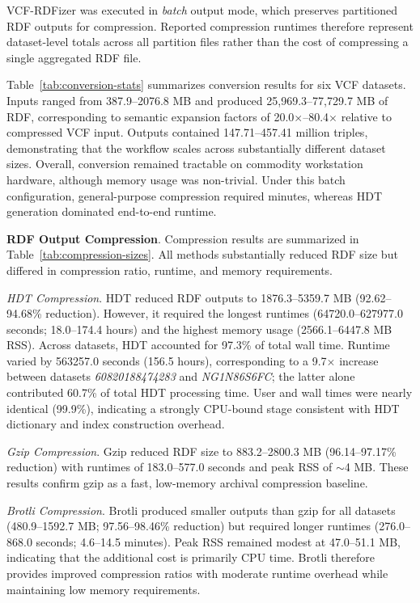 \documentclass[unnumsec,webpdf,contemporary,large]{oup-authoring-template}
\begin{document}
VCF-RDFizer was executed in \textit{batch} output mode, which preserves partitioned RDF outputs for compression.
Reported compression runtimes therefore represent dataset-level totals across all partition files rather than the cost of compressing a single aggregated RDF file.

Table~\ref{tab:conversion-stats} summarizes conversion results for six VCF datasets.
Inputs ranged from 387.9--2076.8 MB and produced 25{,}969.3--77{,}729.7 MB of RDF, corresponding to semantic expansion factors of 20.0$\times$--80.4$\times$ relative to compressed VCF input.
Outputs contained 147.71--457.41 million triples, demonstrating that the workflow scales across substantially different dataset sizes.
Overall, conversion remained tractable on commodity workstation hardware, although memory usage was non-trivial.
Under this batch configuration, general-purpose compression required minutes, whereas HDT generation dominated end-to-end runtime.



\textbf{RDF Output Compression}.
Compression results are summarized in Table~\ref{tab:compression-sizes}.
All methods substantially reduced RDF size but differed in compression ratio, runtime, and memory requirements.

\textit{HDT Compression}.
HDT reduced RDF outputs to 1876.3--5359.7 MB (92.62--94.68\% reduction).
However, it required the longest runtimes (64720.0--627977.0 seconds; 18.0--174.4 hours) and the highest memory usage (2566.1--6447.8 MB RSS).
Across datasets, HDT accounted for 97.3\% of total wall time.
Runtime varied by 563257.0 seconds (156.5 hours), corresponding to a 9.7$\times$ increase between datasets \textit{60820188474283} and \textit{NG1N86S6FC}; the latter alone contributed 60.7\% of total HDT processing time.
User and wall times were nearly identical (99.9\%), indicating a strongly CPU-bound stage consistent with HDT dictionary and index construction overhead.

\textit{Gzip Compression}.
Gzip reduced RDF size to 883.2--2800.3 MB (96.14--97.17\% reduction) with runtimes of 183.0--577.0 seconds and peak RSS of $\sim$4 MB.
These results confirm gzip as a fast, low-memory archival compression baseline.


\textit{Brotli Compression}.
Brotli produced smaller outputs than gzip for all datasets (480.9--1592.7 MB; 97.56--98.46\% reduction) but required longer runtimes (276.0--868.0 seconds; 4.6--14.5 minutes).
Peak RSS remained modest at 47.0--51.1 MB, indicating that the additional cost is primarily CPU time.
Brotli therefore provides improved compression ratios with moderate runtime overhead while maintaining low memory requirements.
\end{document}

